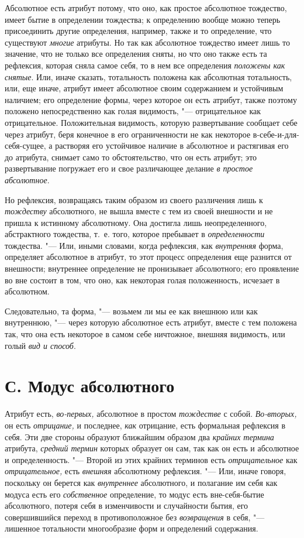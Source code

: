 Абсолютное есть атрибут потому, что оно, как простое абсолютное тождество,
имеет бытие в определении тождества; к определению вообще можно теперь
присоединить другие определения, например, также и то определение, что
существуют {\em многие} атрибуты. Но так как абсолютное
тождество имеет лишь то значение, что не только все определения сняты, но
что оно также есть та рефлексия, которая сняла самое себя, то в нем все
определения {\em положены как снятые}. Или, иначе
сказать, тотальность положена как абсолютная тотальность, или, еще иначе,
атрибут имеет абсолютное своим содержанием и устойчивым наличием; его
определение формы, через которое он есть атрибут, также поэтому положено
непосредственно как голая видимость, "--- отрицательное как отрицательное.
Положительная видимость, которую развертывание сообщает себе через атрибут,
беря конечное в его ограниченности не как некоторое
в-себе-и-для-себя-сущее, а растворяя его устойчивое наличие в абсолютное и
растягивая его до атрибута, снимает само то обстоятельство, что он есть
атрибут; это развертывание погружает его и свое различающее делание
{\em в простое абсолютное}.

Но рефлексия, возвращаясь таким образом из своего различения лишь к
{\em тождеству} абсолютного, не вышла вместе с тем из
своей внешности и не пришла к истинному абсолютному. Она достигла лишь
неопределенного, абстрактного тождества, т.~е. того, которое пребывает в
{\em определенности} тождества. "--- Или, иными словами,
когда рефлексия, как {\em внутренняя} форма, определяет
абсолютное в атрибут, то этот процесс определения еще разнится от
внешности; внутреннее определение не пронизывает абсолютного; его
проявление во вне состоит в том, что оно, как некоторая голая положенность,
исчезает в абсолютном.

Следовательно, та форма, "--- возьмем ли мы ее как внешнюю или как внутреннюю,
"--- через которую абсолютное есть атрибут, вместе с тем положена так, что она
есть некоторое в самом себе ничтожное, внешняя видимость, или голый
{\em вид и способ}.


\section[С. Модус абсолютного]{С. Модус абсолютного}

Атрибут есть, {\em во-первых,} абсолютное в простом {\em тождестве} с собой.
{\em Во-вторых,} он есть {\em отрицание,} и последнее,
{\em как} отрицание, есть формальная рефлексия в себя.
Эти две стороны образуют ближайшим образом два {\em крайних термина} атрибута,
{\em средний термин} которых образует он сам, так как
он есть и абсолютное и определенность. "--- Второй из этих крайних терминов
есть {\em отрицательное} как {\em отрицательное,} есть
{\em внешняя} абсолютному рефлексия. "--- Или, иначе
говоря, поскольку он берется как {\em внутреннее}
абсолютного, и полагание им себя как модуса есть его
{\em собственное} определение, то модус есть
вне-себя-бытие абсолютного, потеря себя в изменчивости и случайности бытия,
его совершившийся переход в противоположное без
{\em возвращения} в себя, "--- лишенное тотальности
многообразие форм и определений содержания.

